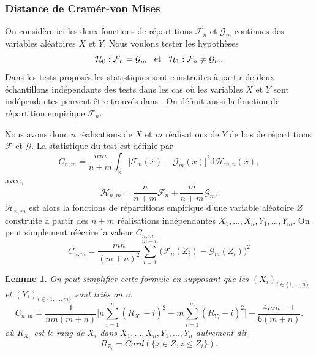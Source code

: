 \documentclass[a4paper,10pt]{article}
\newtheorem{lemma}{Lemme}
\begin{document}
	\subsubsection{Distance de Cramér-von Mises}
	On considère ici les deux fonctions de répartitions $\mathcal{F}_{n}$ et $\mathcal{G}_{m}$ continues des variables aléatoires $X$ et $Y$. Nous voulons tester les hypothèses
	\begin{equation*}
		\mathcal{H}_0 : \mathcal{F}_{n} = \mathcal{G}_{m} \hspace{3mm}\textrm{et}\hspace{3mm} \mathcal{H}_1 : \mathcal{F}_{n} \neq \mathcal{G}_{m}.
	\end{equation*}
	Dans les tests proposés les statistiques sont construites à partir de deux échantillons indépendants des tests dans les cas où les variables $X$ et $Y$ sont indépendantes peuvent être trouvés dans \cite{ethier2011propos}. On définit aussi la fonction de répartition empirique $\mathcal{F}_n$.
	
	Nous avons donc $n$ réalisations de $X$ et $m$ réalisations de $Y$ de lois de répartitions $\mathcal{F}$ et $\mathcal{G}$.
	La statistique du test est définie par
	\begin{equation}
		C_{n,m}=\frac{nm}{n+m}\int_{\mathbb{R}}\big[ \mathcal{F}_{n}(x)-\mathcal{G}_{m}(x)\big]^{2} \mathrm{d} \mathcal{H}_{m,n}(x),
	\end{equation}
	avec,
	\begin{equation}
		\mathcal{H}_{n,m}=\frac{n}{n+m}\mathcal{F}_n+\frac{m}{n+m}\mathcal{G}_m.
	\end{equation}
	$\mathcal{H}_{n,m}$ est alors la fonctions de répartitions empirique d'une variable aléatoire $Z$ construite à partir des $n+m$ réalisations indépendantes $X_1,...,X_n,Y_1,...,Y_m$. On peut simplement réécrire la valeur $C_{n,m}$
	\begin{equation}
		C_{n,m}=\frac{mn}{(m+n)^2}\sum_{i=1}^{m+n}\big(\mathcal{F}_n(Z_i)-\mathcal{G}_{m}(Z_i)\big)^2
	\end{equation}
	
	\begin{lemma}
		\label{C-v}
		On peut simplifier cette formule en supposant que les $(X_i)_{i\in \{1,...,n\}}$ et $(Y_i)_{i\in \{1,...,m\}}$ sont triés on a:
		\begin{equation}
			C_{n,m}=\frac{1}{nm(m+n)}\Big[ n\sum_{i=1}^{n}(R_{X_i}-i)^2+ m\sum_{i=1}^{m}(R_{Y_i}-i)^2\Big]-\frac{4nm-1}{6(m+n)}.
		\end{equation}
		où $R_{X_i}$ est le rang de $X_i$ dans $X_1,...,X_n,Y_1,...,Y_n$ autrement dit 
		\[R_{Z_i}=Card(\{z\in Z, z\leq Z_i\}).\] 
	\end{lemma}
	
\end{document}
